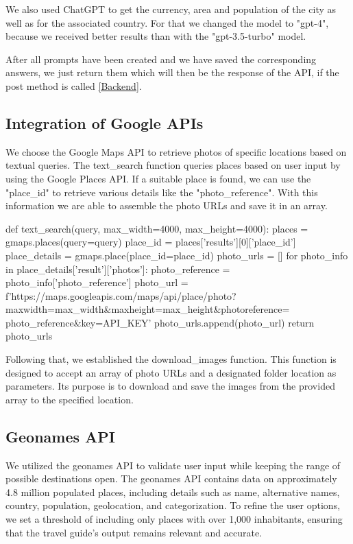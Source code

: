 \documentclass[english,notitlepage,smartquotes]{hgbreport}
\begin{document}
We also used ChatGPT to get the currency, area and population of the city as well as for the associated country. For that we changed the model to "gpt-4", because we received better results than with the "gpt-3.5-turbo" model.

After all prompts have been created and we have saved the corresponding answers, we just return them which will then be the response of the API, if the post method is called \ref{Backend}.

\subsection{Integration of Google APIs}
We choose the Google Maps API to retrieve photos of specific locations based on textual queries. The text\_search function queries places based on user input by using the Google Places API. If a suitable place is found, we can use the "place\_id" to retrieve various details like the "photo\_reference". With this information we are able to assemble the photo URLs and save it in an array.
\begin{PythonCode}
	def text_search(query, max_width=4000, max_height=4000):
	places = gmaps.places(query=query)
	place_id = places['results'][0]['place_id']
	place_details = gmaps.place(place_id=place_id)
	photo_urls = []
	for photo_info in place_details['result']['photos']:
	photo_reference = photo_info['photo_reference']
	photo_url = f'https://maps.googleapis.com/maps/api/place/photo?
	maxwidth={max_width}&maxheight={max_height}&photoreference={
		photo_reference}&key={API_KEY}'
	photo_urls.append(photo_url)
	return photo_urls
\end{PythonCode}
Following that, we established the download\_images function. This function is designed to accept an array of photo URLs and a designated folder location as parameters. Its purpose is to download and save the images from the provided array to the specified location.

\subsection{Geonames API} \label{GeonamesAPI}
We utilized the geonames API to validate user input while keeping the range of possible destinations open. The geonames API contains data on approximately 4.8 million populated places, including details such as name, alternative names, country, population, geolocation, and categorization. To refine the user options, we set a threshold of including only places with over 1,000 inhabitants, ensuring that the travel guide's output remains relevant and accurate.
\end{document}
